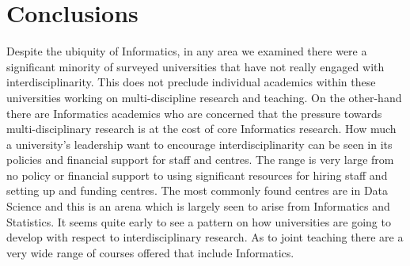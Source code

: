 \section{Conclusions}

Despite the ubiquity of Informatics, in any area we examined there were a significant minority of surveyed universities that have not really engaged with interdisciplinarity.  This does not preclude individual academics within these universities working on multi-discipline research and teaching. On the other-hand there are Informatics academics who are concerned that the pressure towards multi-disciplinary research is at the cost of core Informatics research. How much a university's leadership want to encourage interdisciplinarity can be seen in its policies and financial support for staff and centres.  The range is very large from no policy or financial support to using significant resources for hiring staff and setting up and funding centres. The most commonly found centres are in Data Science and this is an arena which is largely seen to arise from Informatics and Statistics. It seems quite early to see a pattern on how universities are going to develop with respect to interdisciplinary research. As to joint teaching there are a very wide range of courses offered that include Informatics. 
